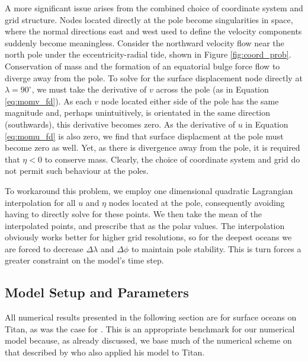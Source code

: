 A more significant issue arises from the combined choice of coordinate system and grid structure. Nodes located directly at the pole become singularities in space, where the normal directions east and west used to define the velocity components suddenly become meaningless. Consider the northward velocity flow near the north pole under the eccentricity-radial tide, shown in Figure \ref{fig:coord_prob}. Conservation of mass and the formation of an equatorial bulge force flow to diverge away from the pole. To solve for the surface displacement node directly at $\lambda = 90^{\circ}$, we must take the derivative of $v$ across the pole (as in Equation \ref{eq:momv_fd}). As each $v$ node located either side of the pole has the same magnitude and, perhaps unintuitively, is orientated in the same direction (southwards), this derivative becomes zero. As the derivative of $u$ in Equation \ref{eq:momu_fd} is also zero, we find that surface displacment at the pole must become zero as well. Yet, as there is divergence away from the pole, it is required that $\eta < 0$ to conserve mass. Clearly, the choice of coordinate system and grid do not permit such behaviour at the poles. 

To workaround this problem, we employ one dimensional quadratic Lagrangian interpolation for all $u$ and $\eta$ nodes located at the pole, consequently avoiding having to directly solve for these points. We then take the mean of the interpolated points, and prescribe that as the polar values. The interpolation obviously works better for higher grid resolutions, so for the deepest oceans we are forced to decrease $\Delta \lambda$ and $\Delta \phi$ to maintain pole stability. This is turn forces a greater constraint on the model's time step.

\subsection{Model Setup and Parameters \label{subsec:param}}

All numerical results presented in the following section are for surface oceans on Titan, as was the case for \citet{sears1995tidal,sohl1995tidal}. This is an appropriate benchmark for our numerical model because, as already discussed, we base much of the numerical scheme on that described by \citet{sears1995tidal} who also applied his model to Titan.


